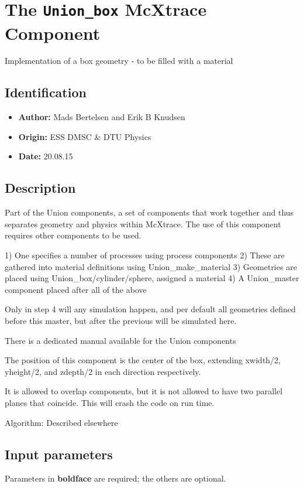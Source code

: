 \section{The \texttt{Union\_box} McXtrace Component}
Implementation of a box geometry - to be filled with a material

\subsection*{Identification}
\begin{itemize}
  \item \textbf{Author:} Mads Bertelsen and Erik B Knudsen
  \item \textbf{Origin:} ESS DMSC \& DTU Physics
  \item \textbf{Date:} 20.08.15
\end{itemize}

\subsection*{Description}
Part of the Union components, a set of components that work together and thus separates geometry and physics within McXtrace. The use of this component requires other components to be used.

1) One specifies a number of processes using process components 2) These are gathered into material definitions using Union\_make\_material 3) Geometries are placed using Union\_box/cylinder/sphere, assigned a material 4) A Union\_master component placed after all of the above

Only in step 4 will any simulation happen, and per default all geometries defined before this master, but after the previous will be simulated here.

There is a dedicated manual available for the Union components

The position of this component is the center of the box, extending xwidth/2, yheight/2, and zdepth/2 in each direction respectively.

It is allowed to overlap components, but it is not allowed to have two parallel planes that coincide. This will crash the code on run time.

Algorithm: Described elsewhere

\subsection*{Input parameters}
Parameters in \textbf{boldface} are required; the others are optional.

